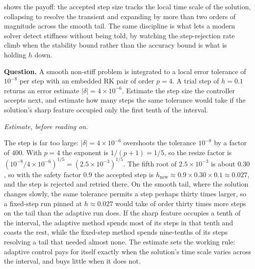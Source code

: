 

 shows the payoff: the accepted step
size tracks the local time scale of the solution, collapsing to resolve
the transient and expanding by more than two orders of magnitude across
the smooth tail. The same discipline is what lets a modern solver
detect stiffness without being told, by watching the step-rejection
rate climb when the stability bound rather than the accuracy bound is
what is holding $h$ down.

\begin{estimation}
\textbf{Question.} A smooth non-stiff problem is integrated to a local
error tolerance of $10^{-8}$ per step with an embedded RK pair of order
$p = 4$. A trial step of $h = 0.1$ returns an error estimate
$|\delta| = 4 \times 10^{-6}$. Estimate the step size the controller
accepts next, and estimate how many steps the same tolerance would take
if the solution's sharp feature occupied only the first tenth of the
interval.

\smallskip
\textit{Estimate, before reading on.}

\smallskip
The step is far too large: $|\delta| = 4 \times 10^{-6}$ overshoots the
tolerance $10^{-8}$ by a factor of $400$. With $p = 4$ the exponent is
$1/(p+1) = 1/5$, so the resize factor is
$(10^{-8}/4\times 10^{-6})^{1/5} = (2.5 \times 10^{-3})^{1/5}$. The
fifth root of $2.5 \times 10^{-3}$ is about $0.30$, so with the safety
factor $0.9$ the accepted step is $h_{\text{new}} \approx 0.9 \times
0.30 \times 0.1 \approx 0.027$, and the step is rejected and retried
there. On the smooth tail, where the solution changes slowly, the same
tolerance permits a step perhaps thirty times larger, so a fixed-step
run pinned at $h \approx 0.027$ would take of order thirty times more
steps on the tail than the adaptive run does. If the sharp feature
occupies a tenth of the interval, the adaptive method spends most of
its steps in that tenth and coasts the rest, while the fixed-step
method spends nine-tenths of its steps resolving a tail that needed
almost none. The estimate sets the working rule: adaptive control pays
for itself exactly when the solution's time scale varies across the
interval, and buys little when it does not.
\end{estimation}

